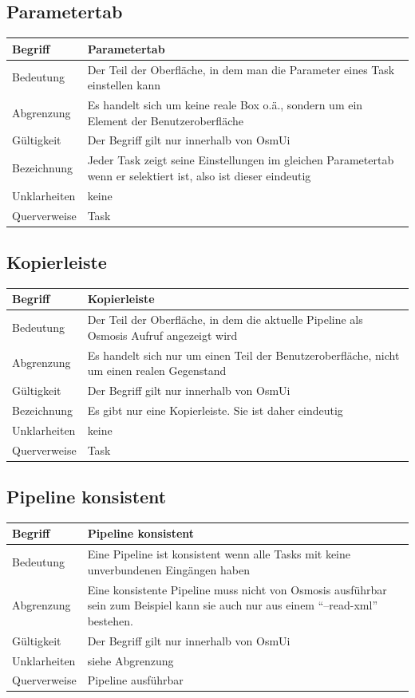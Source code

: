 \documentclass[a4paper,12pt]{scrartcl}
\begin{document}
\begin{center}
\subsection{Parametertab}
\begin{tabular}{|p{5cm}|p{10cm}|}
\hline Begriff & \textbf{Parametertab} \\ 
\hline Bedeutung & Der Teil der Oberfläche, in dem man die Parameter eines Task einstellen kann  \\ 
\hline Abgrenzung & Es handelt sich um keine reale Box o.ä., sondern um ein Element der Benutzeroberfläche\\ 
\hline Gültigkeit & Der Begriff gilt nur innerhalb von OsmUi \\ 
\hline Bezeichnung & Jeder Task zeigt seine Einstellungen im gleichen Parametertab wenn er selektiert ist, also ist dieser eindeutig \\ 
\hline Unklarheiten & keine \\ 
\hline Querverweise & Task \\ 
\hline 
\end{tabular}
\subsection{Kopierleiste}
\begin{tabular}{|p{5cm}|p{10cm}|}
\hline Begriff & \textbf{Kopierleiste} \\ 
\hline Bedeutung & Der Teil der Oberfläche, in dem die aktuelle Pipeline als Osmosis Aufruf angezeigt wird \\ 
\hline Abgrenzung & Es handelt sich nur um einen Teil der Benutzeroberfläche, nicht um einen realen Gegenstand \\ 
\hline Gültigkeit & Der Begriff gilt nur innerhalb von OsmUi \\ 
\hline Bezeichnung & Es gibt nur eine Kopierleiste. Sie ist daher eindeutig \\ 
\hline Unklarheiten & keine \\ 
\hline Querverweise & Task \\ 
\hline 
\end{tabular}
\subsection{Pipeline konsistent}
\begin{tabular}{|p{5cm}|p{10cm}|}
\hline Begriff & \textbf{Pipeline konsistent} \\ 
\hline Bedeutung & Eine Pipeline ist konsistent wenn alle Tasks mit keine unverbundenen Eingängen haben \\ 
\hline Abgrenzung & Eine konsistente Pipeline muss nicht von Osmosis ausführbar sein
\newline zum Beispiel kann sie auch nur aus einem ``--read-xml'' bestehen. \\ 
\hline Gültigkeit & Der Begriff gilt nur innerhalb von OsmUi \\  
\hline Unklarheiten & siehe Abgrenzung \\ 
\hline Querverweise & Pipeline ausführbar \\ 
\hline 
\end{tabular}

\end{center}
\end{document}
